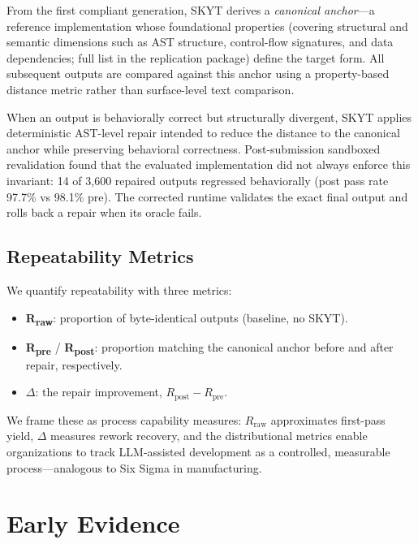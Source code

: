 \documentclass[sigconf]{acmart}
\begin{document}
From the first compliant generation, SKYT derives a \emph{canonical anchor}---a reference implementation whose foundational properties (covering structural and semantic dimensions such as AST structure, control-flow signatures, and data dependencies; full list in the replication package) define the target form.  All subsequent outputs are compared against this anchor using a property-based distance metric rather than surface-level text comparison.

When an output is behaviorally correct but structurally divergent, SKYT applies deterministic AST-level repair intended to reduce the distance to the canonical anchor while preserving behavioral correctness. Post-submission sandboxed revalidation found that the evaluated implementation did not always enforce this invariant: 14 of 3{,}600 repaired outputs regressed behaviorally (post pass rate 97.7\% vs 98.1\% pre). The corrected runtime validates the exact final output and rolls back a repair when its oracle fails.

\subsection{Repeatability Metrics}
\label{sec:metrics}

We quantify repeatability with three metrics:
\begin{itemize}
  \item \textbf{R\textsubscript{raw}}: proportion of byte-identical outputs (baseline, no SKYT).
  \item \textbf{R\textsubscript{pre}} / \textbf{R\textsubscript{post}}: proportion matching the canonical anchor before and after repair, respectively.
  \item \textbf{$\Delta$}: the repair improvement, $R_{\text{post}} - R_{\text{pre}}$.
\end{itemize}
We frame these as process capability measures: $R_{\text{raw}}$ approximates first-pass yield, $\Delta$ measures rework recovery, and the distributional metrics enable organizations to track LLM-assisted development as a controlled, measurable process---analogous to Six Sigma in manufacturing.

\section{Early Evidence}
\label{sec:evidence}
\end{document}
